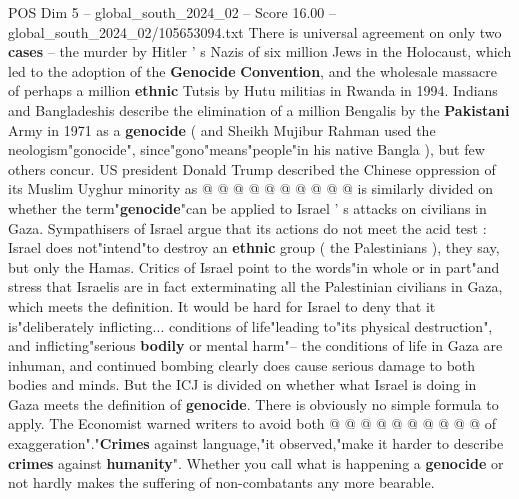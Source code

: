 \begin{textsample}{POS Dim 5 – global\_south\_2024\_02 – Score 16.00 – global\_south\_2024\_02/105653094.txt}
There is universal agreement on only two \textbf{cases} -- the murder by Hitler ' s Nazis of six million Jews in the Holocaust, which led to the adoption of the \textbf{Genocide} \textbf{Convention}, and the wholesale massacre of perhaps a million \textbf{ethnic} Tutsis by Hutu militias in Rwanda in 1994.
Indians and Bangladeshis describe the elimination of a million Bengalis by the \textbf{Pakistani} Army in 1971 as a \textbf{genocide} ( and Sheikh Mujibur Rahman used the neologism"gonocide", since"gono"means"people"in his native Bangla ), but few others concur.
US president Donald Trump described the Chinese oppression of its Muslim Uyghur minority as @ @ @ @ @ @ @ @ @ @ is similarly divided on whether the term"\textbf{genocide}"can be applied to Israel ' s attacks on civilians in Gaza.
Sympathisers of Israel argue that its actions do not meet the acid test : Israel does not"intend"to destroy an \textbf{ethnic} group ( the Palestinians ), they say, but only the Hamas.
Critics of Israel point to the words"in whole or in part"and stress that Israelis are in fact exterminating all the Palestinian civilians in Gaza, which meets the definition.
It would be hard for Israel to deny that it is"deliberately inflicting... conditions of life"leading to"its physical destruction", and inflicting"serious \textbf{bodily} or mental harm"-- the conditions of life in Gaza are inhuman, and continued bombing clearly does cause serious damage to both bodies and minds.
But the ICJ is divided on whether what Israel is doing in Gaza meets the definition of \textbf{genocide}.
There is obviously no simple formula to apply.
The Economist warned writers to avoid both @ @ @ @ @ @ @ @ @ @ of exaggeration"."\textbf{Crimes} against language,"it observed,"make it harder to describe \textbf{crimes} against \textbf{humanity}".
Whether you call what is happening a \textbf{genocide} or not hardly makes the suffering of non-combatants any more bearable.

\end{textsample}

